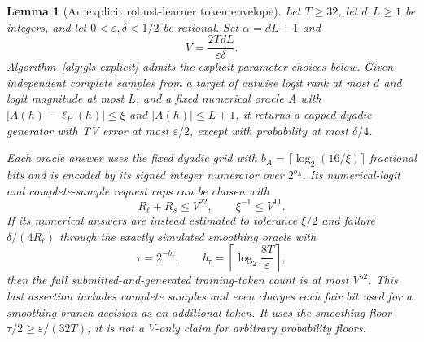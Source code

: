 \documentclass[11pt]{article}
\newtheorem{lemma}[theorem]{Lemma}
\theoremstyle{definition}
\theoremstyle{remark}
\begin{document}
\begin{lemma}[An explicit robust-learner token envelope]\label{lem:explicit-gls-token-envelope}
Let $T\ge32$, let $d,L\ge1$ be integers, and let $0<\varepsilon,\delta<1/2$ be rational. Set $\alpha=dL+1$ and
\[
V=\frac{2TdL}{\varepsilon\delta}.
\]
Algorithm~\ref{alg:gls-explicit} admits the explicit parameter choices below. Given independent complete samples from a target of cutwise logit rank at most $d$ and logit magnitude at most $L$, and a fixed numerical oracle $A$ with $|A(h)-\ell_P(h)|\le\xi$ and $|A(h)|\le L+1$, it returns a capped dyadic generator with TV error at most $\varepsilon/2$, except with probability at most $\delta/4$.

Each oracle answer uses the fixed dyadic grid with $b_A=\lceil\log_2(16/\xi)\rceil$ fractional bits and is encoded by its signed integer numerator over $2^{b_A}$. Its numerical-logit and complete-sample request caps can be chosen with
\[
R_\ell+R_s\le V^{22},\qquad \xi^{-1}\le V^{11}.
\]
If its numerical answers are instead estimated to tolerance $\xi/2$ and failure $\delta/(4R_\ell)$ through the exactly simulated smoothing oracle with
\[
\tau=2^{-b_\tau},\qquad
b_\tau=\left\lceil\log_2\frac{8T}{\varepsilon}\right\rceil,
\]
then the full submitted-and-generated training-token count is at most $V^{52}$. This last assertion includes complete samples and even charges each fair bit used for a smoothing branch decision as an additional token. It uses the smoothing floor $\tau/2\ge\varepsilon/(32T)$; it is not a $V$-only claim for arbitrary probability floors.
\end{lemma}
\end{document}
